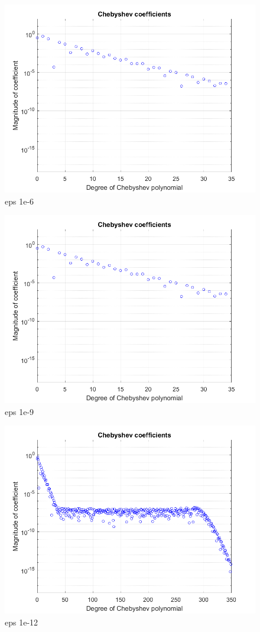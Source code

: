 \documentclass{article}
\begin{document}
\begin{figure}[h!]
\centering
\includegraphics[scale=.5]{-6g.png}
\caption{eps 1e-6}
\label{fig:-6g}
\end{figure}
\begin{figure}[h!]
\centering
\includegraphics[scale=.5]{-9g.png}
\caption{eps 1e-9}
\label{fig:-9g}
\end{figure}
\begin{figure}[h!]
\centering
\includegraphics[scale=.5]{-12g.png}
\caption{eps 1e-12}
\label{fig:-12g}
\end{figure}
\end{document}
